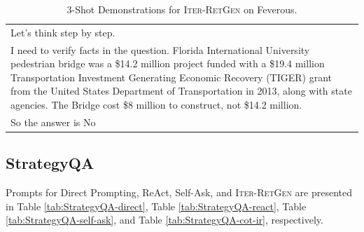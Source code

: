 \begin{table}[t!]
{\begin{tabular}{p{\textwidth}}
Let's think step by step.\\
I need to verify facts in the question. Florida International University pedestrian bridge was a \$14.2 million project funded with a \$19.4 million Transportation Investment Generating Economic Recovery (TIGER) grant from the United States Department of Transportation in 2013, along with state agencies. The Bridge cost \$8 million to construct, not \$14.2 million.\\
So the answer is No\\
\bottomrule
\end{tabular}
}
\caption{3-Shot Demonstrations for I\textsc{ter}-R\textsc{et}G\textsc{en} on Feverous.}\label{tab:Feverous-cot-ir}
\end{table}
\endgroup

\subsection{StrategyQA}
Prompts for Direct Prompting, ReAct, Self-Ask, and I\textsc{ter}-R\textsc{et}G\textsc{en} are presented in Table \ref{tab:StrategyQA-direct}, Table \ref{tab:StrategyQA-react}, Table \ref{tab:StrategyQA-self-ask}, and Table \ref{tab:StrategyQA-cot-ir}, respectively.
\begingroup
\setlength{\tabcolsep}{3pt}
\renewcommand{\arraystretch}{1}
\begin{table}[t!]
\small
\centering
{}
\caption{3-Shot Demonstrations for Direct Prompting on StrategyQA.}\label{tab:StrategyQA-direct}
\end{table}
\endgroup


